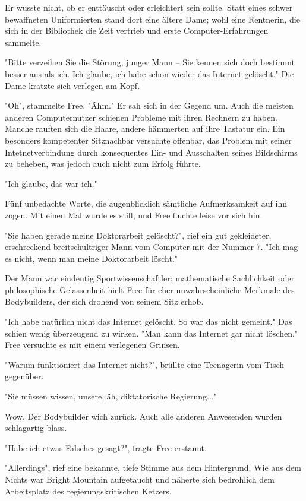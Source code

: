 Er wusste nicht, ob er enttäuscht oder erleichtert sein sollte. Statt eines schwer bewaffneten Uniformierten stand dort eine ältere Dame; wohl eine Rentnerin, die sich in der Bibliothek die Zeit vertrieb und erste Computer-Erfahrungen sammelte.

"Bitte verzeihen Sie die Störung, junger Mann -- Sie kennen sich doch bestimmt besser aus als ich. Ich glaube, ich habe schon wieder das Internet gelöscht." Die Dame kratzte sich verlegen am Kopf.

"Oh", stammelte Free. "Ähm." Er sah sich in der Gegend um. Auch die meisten anderen Computernutzer schienen Probleme mit ihren Rechnern zu haben. Manche rauften sich die Haare, andere hämmerten auf ihre Tastatur ein. Ein besonders kompetenter Sitznachbar versuchte offenbar, das Problem mit seiner Intetnetverbindung durch konsequentes Ein- und Ausschalten seines Bildschirms zu beheben, was jedoch auch nicht zum Erfolg führte.

"Ich glaube, das war ich."

Fünf unbedachte Worte, die augenblicklich sämtliche Aufmerksamkeit auf ihn zogen. Mit einen Mal wurde es still, und Free fluchte leise vor sich hin.

"Sie haben gerade meine Doktorarbeit gelöscht?", rief ein gut gekleideter, erschreckend breitschultriger Mann vom Computer mit der Nummer 7. "Ich mag es nicht, wenn man meine Doktorarbeit löscht."

Der Mann war eindeutig Sportwissenschaftler; mathematische Sachlichkeit oder philosophische Gelassenheit hielt Free für eher unwahrscheinliche Merkmale des Bodybuilders, der sich drohend von seinem Sitz erhob.

"Ich habe natürlich nicht das Internet gelöscht. So war das nicht gemeint." Das schien wenig überzeugend zu wirken. "Man kann das Internet gar nicht löschen." Free versuchte es mit einem verlegenen Grinsen.

"Warum funktioniert das Internet nicht?", brüllte eine Teenagerin vom Tisch gegenüber.

"Sie müssen wissen, unsere, äh, diktatorische Regierung..."

Wow. Der Bodybuilder wich zurück. Auch alle anderen Anwesenden wurden schlagartig blass.

"Habe ich etwas Falsches gesagt?", fragte Free erstaunt.

"Allerdings", rief eine bekannte, tiefe Stimme aus dem Hintergrund. Wie aus dem Nichts war Bright Mountain aufgetaucht und näherte sich bedrohlich dem Arbeitsplatz des regierungskritischen Ketzers.

